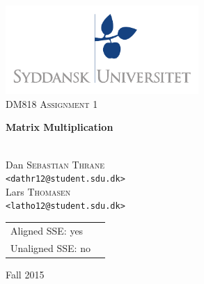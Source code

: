 \documentclass[a4paper,11pt,oneside]{book}
\title{}
\author{}
\date{}
\begin{document}
\begin{titlepage}
\begin{center}

\thispagestyle{empty}
\includegraphics[width=0.55\textwidth]{logo.pdf}\\[1cm]    
\textsc{\Large DM818 Assignment 1}\\[0.5cm]

\begin{Huge}
\textbf{Matrix Multiplication}
\end{Huge}

\vspace{4cm}

\begin{minipage}{1\textwidth}
\begin{center}
\emph{}\\

Dan \textsc{Sebastian Thrane}\\
\verb!<dathr12@student.sdu.dk>!\\

Lars \textsc{Thomasen}\\
\verb!<latho12@student.sdu.dk>!\\

\end{center}
\end{minipage}
\begin{minipage}{0.4\textwidth}
\end{minipage}

\vfill
\begin{tabular}{ll}
    Aligned SSE: yes \\
    Unaligned SSE: no \\
\end{tabular}
\vfill

{\large Fall 2015}\\

\end{center}
\end{titlepage}
\end{document}
